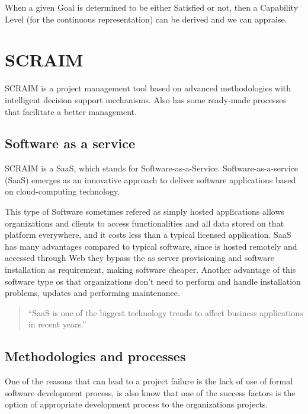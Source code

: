 When a given Goal is determined to be either Satisfied or not, then a Capability Level (for the continuous representation) can be derived and we can appraise.

\section{SCRAIM}

SCRAIM\citep{SCRAIM} is a project management tool based on advanced methodologies with intelligent decision support mechanisms. Also has some ready-made processes that facilitate a better management.

\subsection{Software as a service}

SCRAIM is a SaaS, which stands for Software-as-a-Service. Software-as-a-service (SaaS) emerges as an innovative
approach to deliver software applications based on cloud-computing
technology. \citep{Chou:2007:ANI:1359479.1359484}

This type of Software sometimes refered as simply hosted applications allows organizations and clients to access functionalities and all data stored on that platform everywhere, and it costs less than a typical licensed application. SaaS has many advantages compared to typical software, since is hosted remotely and accessed through Web they bypass the as server provisioning and software
installation as requirement, making software cheaper. Another advantage of this software type os that organizations don't need to perform and handle installation problems, updates and performing maintenance.

\begin{quote}
	``SaaS is one of the biggest technology trends to affect business
	applications in recent years.''~\cite{House2009}
\end{quote}

\subsection{Methodologies and processes}
One of the reasons that can lead to a project failure is the lack of use of formal software development process, is also know that one of the success factors is the option of appropriate development process to the organizations projects.

